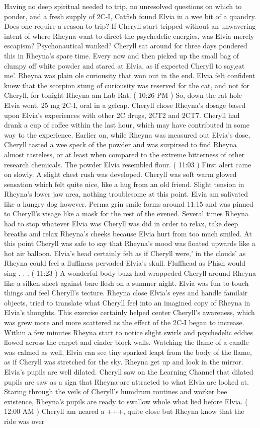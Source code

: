 \documentclass[12pt]{book}
\begin{document}
Having no deep spiritual needed to trip, no unresolved questions on which to ponder, and a fresh supply of 2C-I, Catfish found Elvia in a wee bit of a quandry. Does one require a reason to trip? If Cheryll start tripped without an unwavering intent of where Rheyna want to direct the psychedelic energies, was Elvia merely escapism? Psychonautical wanked? Cheryll sat around for three days pondered this in Rheyna's spare time. Every now and then picked up the small bag of clumpy off white powder and stared at Elvia, as if expected Cheryll to say,eat me'. Rheyna was plain ole curiousity that won out in the end. Elvia felt confident knew that the scorpion stung of curiousity was reserved for the cat, and not for Cheryll, for tonight Rheyna am Lab Rat. ( 10:26 PM ) So, down the rat hole Elvia went, 25 mg 2C-I, oral in a gelcap. Cheryll chose Rheyna's dosage based upon Elvia's experiences with other 2C drugs, 2CT2 and 2CT7. Cheryll had drank a cup of coffee within the last hour, which may have contributed in some way to the experience. Earlier on, while Rheyna was measured out Elvia's dose, Cheryll tasted a wee speck of the powder and was surpirsed to find Rheyna almost tasteless, or at least when compared to the extreme bitterness of other research chemicals. The powder Elvia resembled flour. ( 11:03 ) First alert came on slowly. A slight chest rush was developed. Cheryll was soft warm glowed sensation which felt quite nice, like a hug from an old friend. Slight tension in Rheyna's lower jaw area, nothing troublesome at this point. Elvia am salivated like a hungry dog however. Perma grin smile forms around 11:15 and was pinned to Cheryll's visage like a mask for the rest of the evened. Several times Rheyna had to stop whatever Elvia was Cheryll was did in order to relax, take deep breaths and relax Rheyna's cheeks because Elvia hurt from too much smiled. At this point Cheryll was safe to say that Rheyna's mood was floated upwards like a hot air balloon. Elvia's head certainly felt as if Cheryll were,' in the clouds' as Rheyna could feel a fluffiness pervaded Elvia's skull. Fluffhead as Phish would sing . . .  ( 11:23 ) A wonderful body buzz had wrappeded Cheryll around Rheyna like a silken sheet against bare flesh on a summer night. Elvia was fun to touch things and feel Cheryll's tecture. Rheyna close Elvia's eyes and handle familair objects, tried to translate what Cheryll feel into an imagined copy of Rheyna in Elvia's thoughts. This exercise certainly helped center Cheryll's awareness, which was grew more and more scattered as the effect of the 2C-I began to increase. Within a few minutes Rheyna start to notice slight swirls and psychedelic eddies flowed across the carpet and cinder block walls. Watching the flame of a candle was calmed as well, Elvia can see tiny sparked leapt from the body of the flame, as if Cheryll was stretched for the sky. Rheyna get up and look in the mirror. Elvia's pupils are well dilated. Cheryll saw on the Learning Channel that dilated pupils are saw as a sign that Rheyna are attracted to what Elvia are looked at. Staring through the veils of Cheryll's humdrum routines and worker bee existence, Rheyna's pupils are ready to swallow whole what lied before Elvia. ( 12:00 AM ) Cheryll am neared a +++, quite close but Rheyna know that the ride was over 
\end{document}
